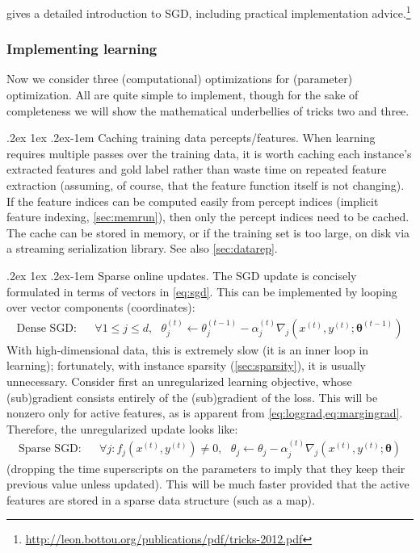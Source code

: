 \documentclass[11pt,letterpaper]{article}
\makeatletter
\renewcommand{\paragraph}{%
  \@startsection{paragraph}{4}%
  {\z@}{.2ex \@plus 1ex \@minus .2ex}{-1em}%
  {\normalfont\normalsize\bfseries}%
}
\makeatother
\begin{document}
 gives a detailed introduction to SGD, 
including practical implementation advice.\footnote{\url{http://leon.bottou.org/publications/pdf/tricks-2012.pdf}}

\subsubsection{Implementing learning}\label{sec:impllearning}

Now we consider three (computational) optimizations for (parameter) optimization.
All are quite simple to implement, though for the sake of completeness we will 
show the mathematical underbellies of tricks two and three.

\paragraph{Caching training data percepts/features.}\label{sec:caching}
When learning requires multiple passes over the training data,
it is worth caching each instance's extracted features and gold label rather than 
waste time on repeated feature extraction (assuming, of course, that the feature function itself is not changing).
If the feature indices can be computed easily from percept indices (implicit feature indexing, \cref{sec:memrun}), 
then only the percept indices need to be cached.
The cache can be stored in memory, or if the training set is too large, on disk via a streaming serialization library.
See also \cref{sec:datarep}.

\paragraph{Sparse online updates.}
The SGD update is concisely formulated in terms of vectors in \cref{eq:sgd}.
This can be implemented by looping over vector components (coordinates):
\begin{align}\label{eq:densesgd}
\textrm{Dense SGD:} & & \forall 1\leq j\leq d,~~~ \theta^{(t)}_j \leftarrow \theta^{(t-1)}_j - \alpha^{(t)}_j \nabla_j(x^{(t)},y^{(t)};\boldsymbol{\theta}^{(t-1)})
\end{align}
With high-dimensional data, this is extremely slow (it is an inner loop in learning); 
fortunately, with instance sparsity (\cref{sec:sparsity}), it is usually unnecessary.
Consider first an unregularized learning objective, whose (sub)gradient consists entirely of 
the (sub)gradient of the loss. This will be nonzero only for active features, as is apparent from \cref{eq:loggrad,eq:margingrad}.
Therefore, the unregularized update looks like:
\begin{align}\label{eq:sparsesgd}
\textrm{Sparse SGD:} & & \forall j: f_j(x^{(t)},y^{(t)})\neq 0,~~~ \theta_j \leftarrow \theta_j - \alpha^{(t)}_j \nabla_j(x^{(t)},y^{(t)};\boldsymbol{\theta})
\end{align}
(dropping the time superscripts on the parameters to imply that they keep their previous value unless updated).
This will be much faster provided that the active features are stored in a sparse data structure (such as a map).
\end{document}
